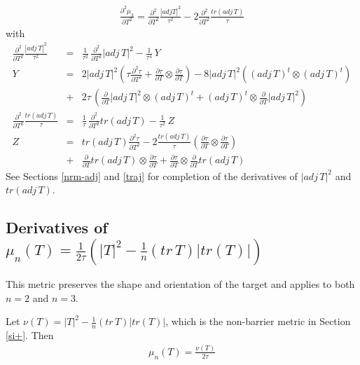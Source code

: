 \documentclass{report}
\begin{document}
\begin{eqnarray}
\frac{\partial^2 \mu_3}{\partial T^2} = \frac{\partial^2}{\partial T^2} \frac{|adj T|^2}{\tau^2} - 2 \frac{\partial^2}{\partial T^2} \frac{tr(adj \, T)}{\tau}
\end{eqnarray}
with
\begin{eqnarray}
\frac{\partial^2}{\partial T^2} \frac{|adj \, T|^2}{\tau^2} & = & \frac{1}{\tau^2} \, \frac{\partial^2}{\partial T^2} |adj \, T|^2 - \frac{1}{\tau^4} \, Y \label{adj-frac} \\
Y & = & 2 |adj \, T|^2 \left( \tau \frac{\partial^2 \tau}{\partial T^2} + \frac{\partial \tau}{\partial T} \otimes \frac{\partial \tau}{\partial T} \right) - 8 |adj \, T|^2 \left( (adj \, T)^t \otimes (adj \, T)^t \right) \nonumber \label{yadj-frac} \\
 & + & 2 \tau \, \left( \frac{\partial}{\partial T} |adj \, T|^2 \otimes (adj \, T)^t + (adj \, T)^t \otimes  \frac{\partial}{\partial T} |adj \, T|^2 \right) \\
\frac{\partial^2}{\partial T^2} \frac{tr(adj \, T)}{\tau} & = & \frac{1}{\tau} \, \frac{\partial^2}{\partial T^2} tr(adj \, T) - \frac{1}{\tau^2} \, Z \\
Z & = & tr(adj \, T) \frac{\partial^2 \tau}{\partial T^2} - 2 \frac{tr(adj \, T)}{\tau} \left( \frac{\partial \tau}{\partial T} \otimes  \frac{\partial \tau}{\partial T} \right) \nonumber \\
 & + & \frac{\partial}{\partial T} tr(adj \, T) \otimes \frac{\partial \tau}{\partial T} + \frac{\partial \tau}{\partial T} \otimes  \frac{\partial}{\partial T} tr(adj \, T)
\end{eqnarray}
See Sections \ref{nrm-adj} and \ref{traj} for completion of the derivatives of 
$|adj \, T|^2$ and $tr(adj \, T)$. \newline

\subsection{Derivatives of $\mu_n(T) = \frac{1}{2\tau} \left( |T|^2 - \frac{1}{n} (tr \, T) |tr(T)| \right)$ \label{nu-over-tau}}

\noindent This metric preserves the shape and orientation of the target and
applies to both $n=2$ and $n=3$. \newline

\noindent Let $\nu(T) = |T|^2 - \frac{1}{n} (tr \, T) |tr(T)|$, which is the 
non-barrier metric in Section \ref{si+}. Then
\begin{eqnarray}
\mu_n(T) = \frac{\nu(T)}{2 \tau}
\end{eqnarray}
\end{document}
